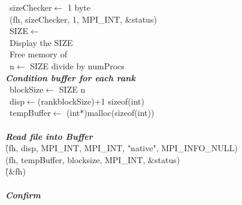 \documentclass[11pt,conference]{IEEEtran}
\begin{document}
\begin{algorithm}[h]
\ sizeChecker$\leftarrow$ 1 byte \\
\ \file(fh, sizeChecker, 1, MPI\_INT, \&status) \\
\ SIZE$\leftarrow$\sizeChecker[0] \\
\ Display the SIZE \\
\ Free memory of \sizeChecker \\
\ n$\leftarrow$ SIZE divide by numProcs
\vspace{0.5cm} \\
\emph{\textbf{Condition buffer for each rank}}\\
\ blockSize$\leftarrow$ SIZE \times n \\
\ disp$\leftarrow$(rank\times blockSize)+1 \times sizeof(int) \\
\ tempBuffer$\leftarrow$ (int*)malloc(sizeof(int)) \\
\vspace{0.5cm} \\
\emph{\textbf{Read file into Buffer}}\\
\f (fh, disp, MPI\_INT, MPI\_INT, "native", MPI\_INFO\_NULL)\\
\g (fh, tempBuffer, blocksize, MPI\_INT, \&status)\\
\h (\&fh)\\
\vspace{0.5cm} \\
\emph{\textbf{Confirm}}\\

\label{block}
\end{algorithm}

\end{document}
